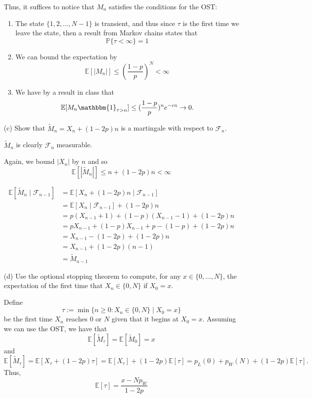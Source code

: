 \documentclass[11pt]{article}
\newcommand{\bbE}{\mathbb{E}}
\newcommand{\bbP}{\mathbb{P}}
\begin{document}
\begin{itemize}
\begin{solution}
        Thus, it suffices to notice that $M_n$ satisfies the conditions for the OST:
        \begin{enumerate}
            \item The state $\{1,2,\dots, N-1\}$ is transient, and thus since $\tau$ is the first time we leave the state, then a result from Markov chains states that
            \[\bbP\{\tau  < \infty\} =1 \]
            \item We can bound the expectation by 
            \[\bbE[|M_n|] \leq \left( \frac{1-p}{p}\right)^N < \infty\]
            \item We have by a result in class that
            \[\bbE[M_n \mathbbm{1}_{\tau > n}] \leq (\frac{1-p}{p})^ne^{-cn} \to 0.\]
        \end{enumerate}
    \end{solution}
    \item[(c)] Show that \(\widetilde{M}_n = X_n + (1 - 2p)n\) is a martingale with respect to \(\mathcal{F}_n\).
    \begin{solution}
        $\widetilde{M}_n$ is clearly $\mathcal{F}_n$ measurable.

        Again, we bound $|X_n|$ by $n$ and so 
        \[\bbE[|\widetilde{M}_n|] \leq n + (1-2p)n < \infty\]

        \begin{align*}
            \bbE[\widetilde{M}_n \mid \mathcal{F}_{n-1}]&= \bbE[X_n + (1-2p)n \mid \mathcal{F}_{n-1}]\\
            &= \bbE[X_n\mid \mathcal{F}_{n-1}] + (1-2p)n\\
            &= p(X_{n-1} +1) + (1-p)(X_{n-1} - 1) + (1-2p)n\\
            &= pX_{n-1} + (1-p)X_{n-1} + p - (1-p) + (1-2p)n\\
            &= X_{n-1} -(1 - 2p) + (1-2p)n\\
            &= X_{n-1} + (1-2p)(n-1)\\
            &= \widetilde{M}_{n-1}
        \end{align*}
    \end{solution}
    \item[(d)] Use the optional stopping theorem to compute, for any \(x \in \{0, \ldots, N\}\), the expectation of the first time that \(X_n \in \{0, N\}\) if \(X_0 = x\).
    \begin{solution}
        Define
        \[\tau:= \min\{ n \geq 0 : X_n \in \{0, N\} \mid X_0 = x\}\] be the first time $X_n$ reaches $0$ or $N$ given that it begins at $X_0 = x.$ Assuming we can use the OST, we have that 
        \[\bbE[\widetilde{M}_\tau] = \bbE[\widetilde{M}_0] = x\] and 
        \[\bbE[\widetilde{M}_\tau] = \bbE[X_\tau + (1-2p)\tau] = \bbE[X_\tau]+ (1-2p)\bbE[\tau] = p_L(0) + p_W(N) + (1-2p)\bbE[\tau].\]
        Thus, 
        \[\bbE[\tau] = \frac{x- Np_W}{1-2p}\]
    \end{solution}
\end{itemize}
\end{document}
